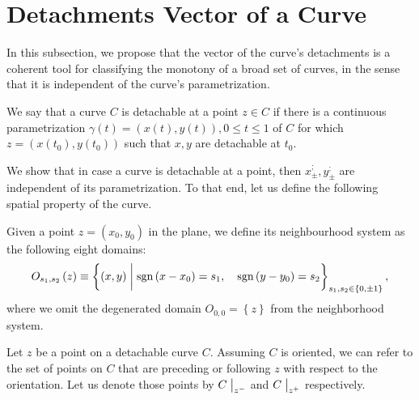 \documentclass[11pt]{book}
\begin{document}
\section{Detachments Vector of a Curve}

In this subsection, we propose that the vector of the curve's
detachments is a coherent tool for classifying the monotony of a broad
set of curves, in the sense that it is independent of the curve's
parametrization.

\begin{definition}
We say that a curve $C$ is detachable
at a point $z\in C$ if there is a continuous parametrization
$\gamma\left(t\right)=\left(x\left(t\right),y\left(t\right)\right),0\leq t\leq1$
of $C$ for which $z=\left(x\left(t_{0}\right),y\left(t_{0}\right)\right)$
such that $x,y$ are detachable at $t_{0}$.
\end{definition}

We show that in case a
curve is detachable at a point, then $x_{\pm}^{;},y_{\pm}^{;}$
are independent of its parametrization. To that end, let us define the
following spatial property of the curve.

\begin{definition}
Given a point $z=\left(x_{0},y_{0}\right)$
in the plane, we define its neighbourhood system as the following
eight domains:
\[
O_{s_{1},s_{2}}\left(z\right)\equiv\left\{ \left(x,y\right)\biggm\lvert \text{sgn}\left(x-x_{0}\right)=s_{1},\quad \text{sgn}\left(y-y_{0}\right)=s_{2}\right\} _{s_{1},s_{2}\in\left\{ 0,\pm1\right\} },
\]
where we omit the degenerated domain $O_{0,0}=\left\{ z\right\} $
from the neighborhood system.
\end{definition}

Let $z$ be a point on a detachable curve $C$. Assuming $C$ is oriented, we can refer to the set of points on $C$ that are preceding or following $z$ with respect to the orientation. Let us
denote those points by $C\bigm\lvert_{z^{-}}$ and $C\bigm\lvert_{z^{+}}$
respectively.
\end{document}
